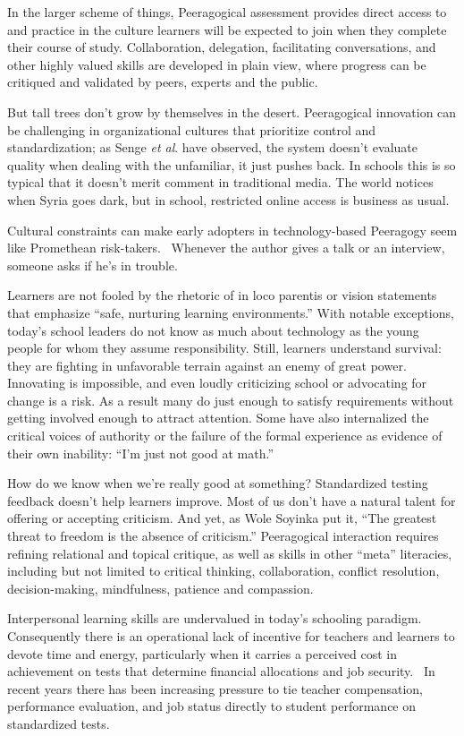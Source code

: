 In the larger scheme of things, Peeragogical assessment provides direct
access to and practice in the culture learners will be expected to join
when they complete their course of study. Collaboration, delegation,
facilitating conversations, and other highly valued skills are developed
in plain view, where progress can be critiqued and validated by peers,
experts and the public.

But tall trees don't grow by themselves in the desert. Peeragogical
innovation can be challenging in organizational cultures that prioritize
control and standardization; as Senge \emph{et al}. have observed, the
system doesn't evaluate quality when dealing with the unfamiliar, it
just pushes back. In schools this is so typical that it doesn't merit
comment in traditional media. The world notices when Syria goes dark,
but in school, restricted online access is business as usual.

Cultural constraints can make early adopters in technology-based
Peeragogy seem like Promethean risk-takers.~ Whenever the author gives a
talk or an interview, someone asks if he's in trouble.

Learners are not fooled by the rhetoric of in loco parentis or vision
statements that emphasize ``safe, nurturing learning environments.''
With notable exceptions, today's school leaders do not know as much
about technology as the young people for whom they assume
responsibility. Still, learners understand survival: they are fighting
in unfavorable terrain against an enemy of great power. Innovating is
impossible, and even loudly criticizing school or advocating for change
is a risk. As a result many do just enough to satisfy requirements
without getting involved enough to attract attention. Some have also
internalized the critical voices of authority or the failure of the
formal experience as evidence of their own inability: ``I'm just not
good at math.''

How do we know when we're really good at something? Standardized testing
feedback doesn't help learners improve. Most of us don't have a natural
talent for offering or accepting criticism. And yet, as Wole Soyinka put
it, ``The greatest threat to freedom is the absence of criticism.''
Peeragogical interaction requires refining relational and topical
critique, as well as skills in other ``meta'' literacies, including but
not limited to critical thinking, collaboration, conflict resolution,
decision-making, mindfulness, patience and compassion.

Interpersonal learning skills are undervalued in today's schooling
paradigm. Consequently there is an operational lack of incentive for
teachers and learners to devote time and energy, particularly when it
carries a perceived cost in achievement on tests that determine
financial allocations and job security.~ In recent years there has been
increasing pressure to tie teacher compensation, performance evaluation,
and job status directly to student performance on standardized tests.

